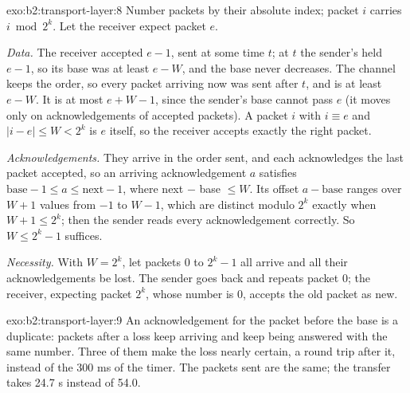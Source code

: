 \begin{solution}{exo:b2:transport-layer:8}
Number packets by their absolute index; packet $i$ carries $i \bmod 2^k$. Let the receiver expect packet $e$.

\emph{Data.} The receiver accepted $e - 1$, sent at some time $t$; at $t$ the sender's  held $e - 1$, so its
base was at least $e - W$, and the base never decreases. The channel keeps the order, so every packet arriving now was
sent after $t$, and is at least $e - W$. It is at most $e + W - 1$, since the sender's base cannot pass $e$ (it moves
only on acknowledgements of accepted packets). A packet $i$ with $i \equiv e$ and $|i - e| \le W < 2^k$ is $e$ itself,
so the receiver accepts exactly the right packet.

\emph{Acknowledgements.} They arrive in the order sent, and each acknowledges the last packet accepted, so an arriving
acknowledgement $a$ satisfies $\text{base} - 1 \le a \le \text{next} - 1$, where next $-$ base $\le W$. Its offset $a -
\text{base}$ ranges over $W + 1$ values from $-1$ to $W - 1$, which are distinct modulo $2^k$ exactly when $W + 1 \le
2^k$; then the sender reads every acknowledgement correctly. So $W \le 2^k - 1$ suffices.

\emph{Necessity.} With $W = 2^k$, let packets $0$ to $2^k - 1$ all arrive and all their acknowledgements be lost. The
sender goes back and repeats packet 0; the receiver, expecting packet $2^k$, whose number is 0, accepts the old packet
as new.
\end{solution}

\begin{solution}{exo:b2:transport-layer:9}
An acknowledgement for the packet before the base is a duplicate: packets after a loss keep arriving and keep being
answered with the same number. Three of them make the loss nearly certain, a round trip after it, instead of the
300 ms of the timer. The packets sent are the same; the transfer takes 24.7 s instead of 54.0.
\end{solution}

